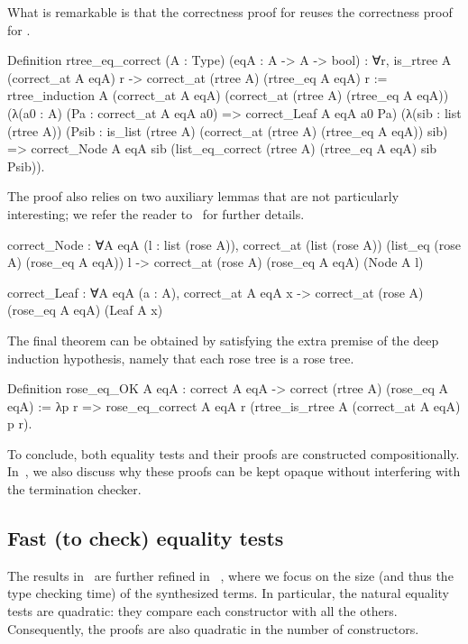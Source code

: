 \documentclass{these-ISSS}
\newenvironment{rocqcode}
  {\VerbatimEnvironment\begin{rocqbox}\begin{xrocqcode}}{\end{xrocqcode}
\end{rocqbox}}
\begin{document}
\noindent
What is remarkable is that the correctness proof for 
reuses the correctness proof for .

\begin{rocqcode}
Definition rtree_eq_correct (A : Type) (eqA : A -> A -> bool) :
  ∀r, is_rtree A (correct_at A eqA) r ->
        correct_at (rtree A) (rtree_eq A eqA) r
:=
  rtree_induction
    A (correct_at A eqA) (correct_at (rtree A) (rtree_eq A eqA))
    (λ(a0 : A) (Pa : correct_at A eqA a0) =>
       correct_Leaf A eqA a0 Pa)
    (λ(sib : list (rtree A))
         (Psib : is_list (rtree A)
                   (correct_at (rtree A) (rtree_eq A eqA)) sib) =>
       correct_Node A eqA sib
         (list_eq_correct (rtree A) (rtree_eq A eqA) sib Psib)).
\end{rocqcode}

\noindent
The proof also relies on two auxiliary lemmas that are not particularly
interesting; we refer the reader to~\cite{tassi:hal-01897468} for further
details.

\begin{rocqcode}
correct_Node : ∀A eqA (l : list (rose A)),
  correct_at (list (rose A)) (list_eq (rose A) (rose_eq A eqA)) l ->
    correct_at (rose A) (rose_eq A eqA) (Node A l)

correct_Leaf : ∀A eqA (a : A),
  correct_at A eqA x ->
    correct_at (rose A) (rose_eq A eqA) (Leaf A x)
\end{rocqcode}

The final theorem can be obtained by satisfying the extra premise of the deep
induction hypothesis, namely that each rose tree is a rose tree.

\begin{rocqcode}
Definition rose_eq_OK A eqA :
  correct A eqA -> correct (rtree A) (rose_eq A eqA)
:=
  λp r =>
    rose_eq_correct A eqA
      r (rtree_is_rtree A (correct_at A eqA) p r).
\end{rocqcode}


To conclude, both equality tests and their proofs are constructed
compositionally. In~\cite{tassi:hal-01897468}, we also discuss why these proofs
can be kept opaque without interfering with the termination checker.

\subsection{Fast (to check) equality tests}

The results in~\cite{tassi:hal-01897468} are further refined in
~\cite{gregoire:hal-03800154}, where we focus on the size (and thus the type
checking time) of the synthesized terms. In particular, the natural equality
tests are quadratic: they compare each constructor with all the others.
Consequently, the proofs are also quadratic in the number of constructors.
\end{document}
